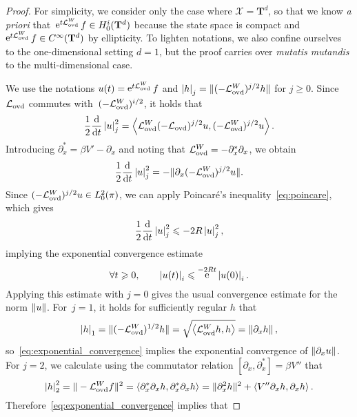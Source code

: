 \documentclass[11pt,a4paper]{article}
\DeclareMathOperator{\e}{e}
\newcommand{\commut}[2]{[#1, #2]}
\newcommand{\torus}{\mathbf T}
\theoremstyle{plain}
\numberwithin{equation}{section}
\renewcommand{\leq}{\leqslant}
\renewcommand{\geq}{\geqslant}
\begin{document}
\begin{proof}
    For simplicity, we consider only the case where $\mathcal X = \torus^d$,
    so that we know \emph{a priori} that~$\e^{t \mathcal L_{\rm ovd}^W} f \in H^i_0(\torus^d)$ because
    the state space is compact and $\e^{t \mathcal L_{\rm ovd}^W} f \in C^{\infty}(\torus^d)$ by ellipticity.
    To lighten notations,
    we also confine ourselves to the one-dimensional setting $d = 1$,
    but the proof carries over \emph{mutatis mutandis} to the multi-dimensional case.

    We use the notations $u(t) = \e^{t \mathcal L_{\rm ovd}^W} f$ and
     $\seminorm{h}_j = \norm*{(- \mathcal L_{\rm ovd}^W)^{j/2} h}$ for $j \geq 0$.
    Since $\mathcal L_{\rm ovd}$ commutes with~$(-\mathcal L_{\rm ovd}^W)^{i/2}$,
    it holds that
    \[
        \frac{1}{2} \derivative*{1}{t} \seminorm{u}_j^2 = \ip{\mathcal L_{\rm ovd}^W (-\mathcal L_{\rm ovd})^{j/2} u}{(- \mathcal L_{\rm ovd}^W)^{j/2} u}.
    \]
    Introducing $\partial_x^* = \beta V' - \partial_x$
    and noting that $\mathcal L_{\rm ovd}^W = - \partial_x^* \partial_x$,
    we obtain
    \[
        \frac{1}{2} \derivative*{1}{t} \seminorm{u}_j^2 = - \norm*{\partial_x (-\mathcal L_{\rm ovd}^W)^{j/2} u}.
    \]
    Since $(-\mathcal L_{\rm ovd}^W)^{j/2} u \in L^2_0(\pi)$,
    we can apply Poincar\'e's inequality~\eqref{eq:poincare},
    which gives
    \[
        \frac{1}{2} \derivative*{1}{t} \seminorm{u}_j^2 \leq - 2R \seminorm{u}_j^2,
    \]
    implying the exponential convergence estimate
    \begin{equation}
        \label{eq:exponential_convergence}
        \forall t \geq 0, \qquad
        \seminorm{u(t)}_i \leq \e^{- 2 R t} \seminorm{u(0)}_i.
    \end{equation}
    Applying this estimate with $j = 0$ gives the usual convergence estimate for the norm $\norm{u}$.
    For~$j = 1$, it holds for sufficiently regular $h$ that
    \[
        \seminorm{h}_1 = \norm*{(- \mathcal L_{\rm ovd}^W)^{1/2} h} = \sqrt{\ip{\mathcal L_{\rm ovd}^W h}{h}} = \norm{\partial_x h},
    \]
    so~\eqref{eq:exponential_convergence} implies the exponential convergence of $\norm{\partial_x u}$.
    For $j = 2$, we calculate using the commutator relation $\commut{\partial_x}{\partial_x^*} = \beta V''$ that
    \[
        \seminorm{h}_2^2 = \norm*{- \mathcal L_{\rm ovd}^Wf}^2
        = \ip{\partial_x^* \partial_x h}{\partial_x^* \partial_x h}
        = \norm*{\partial_x^2 h}^2 + \ip{V'' \partial_x h}{\partial_x h}.
    \]
    Therefore~\eqref{eq:exponential_convergence} implies that

\end{proof}
\end{document}
